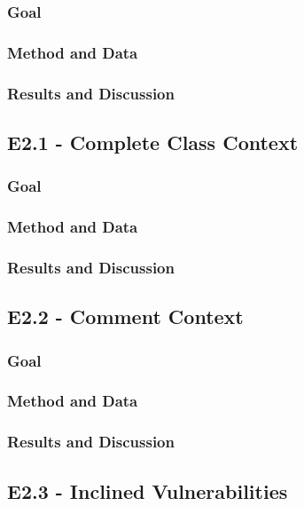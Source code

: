 \subsubsection{Goal}
\subsubsection{Method and Data}
\subsubsection{Results and Discussion}


\subsection{E2.1 - Complete Class Context}
\label{sec:e2.1-complete-class-context}

\subsubsection{Goal}
\subsubsection{Method and Data}
\subsubsection{Results and Discussion}


\subsection{E2.2 - Comment Context}
\label{sec:e2.2-comment-context}

\subsubsection{Goal}
\subsubsection{Method and Data}
\subsubsection{Results and Discussion}

\subsection{E2.3 - Inclined Vulnerabilities}
\label{sec:e2.3-inclined-vulnerabilities}

